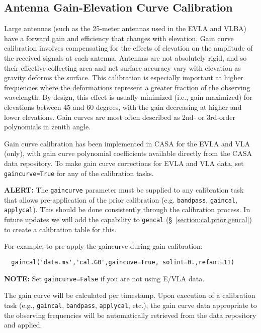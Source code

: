 \subsection{Antenna Gain-Elevation Curve Calibration}
\label{section:cal.prior.curves}

Large antennas (such as the 25-meter antennas used
in the EVLA and VLBA) have a forward gain and efficiency that changes with
elevation. Gain curve calibration involves compensating for the effects of
elevation on the amplitude of the received signals at each antenna.
Antennas are not absolutely rigid, and so their effective collecting
area and net surface accuracy vary with elevation as gravity deforms
the surface.  This calibration is especially important at higher
frequencies where the deformations represent a greater fraction of the
observing wavelength.  By design, this effect is usually minimized
(i.e., gain maximized) for elevations between 45 and 60 degrees, with
the gain decreasing at higher and lower elevations.  Gain curves are
most often described as 2nd- or 3rd-order polynomials in zenith angle.

Gain curve calibration has been implemented in CASA for the EVLA and
VLA (only), with gain curve polynomial coefficients available directly
from the CASA data repository.  To make gain curve corrections for
EVLA and VLA data, set {\tt gaincurve=True} for any of the calibration
tasks.

{\bf ALERT:} The {\tt gaincurve} parameter must be supplied
to any calibration task that allows pre-application of the prior
calibration (e.g. {\tt bandpass}, {\tt gaincal}, {\tt applycal}).
This should be done consistently through the calibration process.
In future updates we will add the capability to {\tt gencal}
(\S~\ref{section:cal.prior.gencal}) to create a calibration table for this.

For example, to pre-apply the gaincurve during gain calibration:
\small
\begin{verbatim}
  gaincal('data.ms','cal.G0',gaincuve=True, solint=0.,refant=11)
\end{verbatim}
\normalsize
{\bf NOTE:} Set {\tt gaincurve=False} if you are not using E/VLA data.

The gain curve will be calculated per timestamp.  Upon execution of a
calibration task (e.g., {\tt gaincal}, {\tt bandpass}, {\tt applycal}, 
etc.), the gain
curve data appropriate to the observing frequencies will be
automatically retrieved from the data repository and applied.

